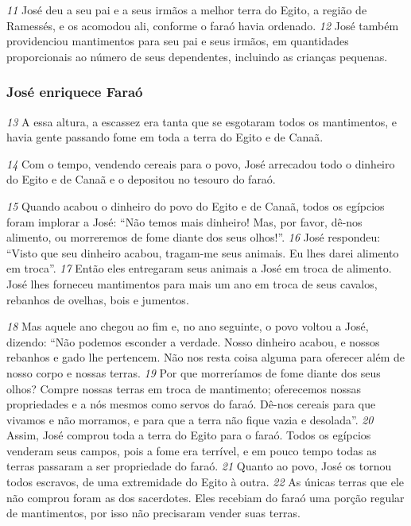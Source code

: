 \bigskip
\textit{\tiny 11}
José deu a seu pai e a seus irmãos a melhor terra do Egito, a região de
Ramessés, e os acomodou ali, conforme o faraó havia ordenado. 
\textit{\tiny 12}
José também
providenciou mantimentos para seu pai e seus irmãos, em quantidades
proporcionais ao número de seus dependentes, incluindo as crianças pequenas.

\bigskip
\subsubsection*{José enriquece Faraó}
\textit{\tiny 13}
A essa altura, a escassez era tanta que se esgotaram todos os mantimentos, e
havia gente passando fome em toda a terra do Egito e de Canaã. 

\bigskip
\textit{\tiny 14}
Com o tempo,
vendendo cereais para o povo, José arrecadou todo o dinheiro do Egito e de Canaã
e o depositou no tesouro do faraó. 

\bigskip
\textit{\tiny 15}
Quando acabou o dinheiro do povo do Egito
e de Canaã, todos os egípcios foram implorar a José: “Não temos mais dinheiro!
Mas, por favor, dê-nos alimento, ou morreremos de fome diante dos seus olhos!”.
\textit{\tiny 16}
José respondeu: “Visto que seu dinheiro acabou, tragam-me seus animais. Eu
lhes darei alimento em troca”. 
\textit{\tiny 17}
Então eles entregaram seus animais a José em
troca de alimento. José lhes forneceu mantimentos para mais um ano em troca de
seus cavalos, rebanhos de ovelhas, bois e jumentos.

\bigskip
\textit{\tiny 18}
Mas aquele ano chegou ao fim e, no ano seguinte, o povo voltou a José,
dizendo: “Não podemos esconder a verdade. Nosso dinheiro acabou, e nossos
rebanhos e gado lhe pertencem. Não nos resta coisa alguma para oferecer além de
nosso corpo e nossas terras. 
\textit{\tiny 19}
Por que morreríamos de fome diante dos seus
olhos? Compre nossas terras em troca de mantimento; oferecemos nossas
propriedades e a nós mesmos como servos do faraó. Dê-nos cereais para que
vivamos e não morramos, e para que a terra não fique vazia e desolada”.
\textit{\tiny 20}
Assim, José comprou toda a terra do Egito para o faraó. Todos os egípcios
venderam seus campos, pois a fome era terrível, e em pouco tempo todas as terras
passaram a ser propriedade do faraó. 
\textit{\tiny 21}
Quanto ao povo, José os tornou todos
escravos,
de uma extremidade do Egito à outra. 
\textit{\tiny 22}
As únicas terras que ele não
comprou foram as dos sacerdotes. Eles recebiam do faraó uma porção regular de
mantimentos, por isso não precisaram vender suas terras.

